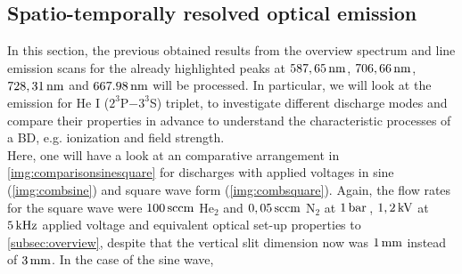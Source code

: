 \documentclass[a4paper,10pt,twoside]{article}
\begin{document}
		
		\subsection{Spatio-temporally resolved optical emission}\label{subsec:stroe}
		
			In this section, the previous obtained results from the overview spectrum and line emission scans for the already highlighted peaks at $\unit[587,65]{nm}$, $\unit[706,66]{nm}$, $\unit[728,31]{nm}$ and $\unit[667.98]{nm}$ will be processed. In particular, we will look at the emission for He I ($2^3$P$-3^3$S) triplet, to investigate different discharge modes and compare their properties in advance to understand the characteristic processes of a BD, e.g. ionization and field strength.\\
			Here, one will have a look at an comparative arrangement in \autoref{img:comparisonsinesquare} for discharges with applied voltages in sine (\autoref{img:combsine}) and square wave form (\autoref{img:combsquare}). Again, the flow rates for the square wave were $\unit[100]{sccm}$ He$_2$ and $\unit[0,05]{sccm}$ N$_2$ at $\unit[1]{bar}$\,, $\unit[1,2]{kV}$ at $\unit[5]{kHz}$ applied voltage and equivalent optical set-up properties to \autoref{subsec:overview}, despite that the vertical slit dimension now was $\unit[1]{mm}$ instead of $\unit[3]{mm}$. In the case of the sine wave,
\end{document}
